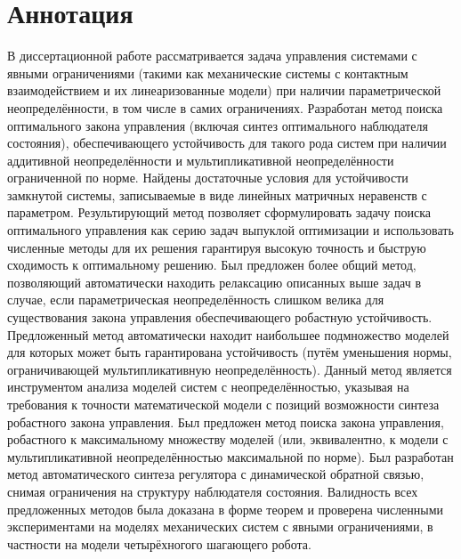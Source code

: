 \chapter*{Аннотация}                         %

В диссертационной работе рассматривается задача управления системами с явными ограничениями (такими как механические системы с контактным взаимодействием и их линеаризованные модели) при наличии параметрической неопределённости, в том числе в самих ограничениях. Разработан метод поиска оптимального закона управления (включая синтез оптимального наблюдателя состояния), обеспечивающего устойчивость для такого рода систем при наличии аддитивной неопределённости и мультипликативной неопределённости ограниченной по норме. Найдены достаточные условия для устойчивости замкнутой системы, записываемые в виде линейных матричных неравенств с параметром. Результирующий метод позволяет сформулировать задачу поиска оптимального управления как серию задач выпуклой оптимизации и использовать численные методы для их решения гарантируя высокую точность и быструю сходимость к оптимальному решению. Был предложен более общий метод, позволяющий автоматически находить релаксацию описанных выше задач в случае, если параметрическая неопределённость слишком велика для существования закона управления обеспечивающего робастную устойчивость. Предложенный метод автоматически находит наибольшее подмножество моделей для которых может быть гарантирована устойчивость (путём уменьшения нормы, ограничивающей мультипликативную неопределённость). Данный метод является инструментом анализа моделей систем с неопределённостью, указывая на требования к точности математической модели с позиций возможности синтеза робастного закона управления. Был предложен метод поиска закона управления, робастного к максимальному множеству моделей (или, эквивалентно, к модели с мультипликативной неопределённостью максимальной по норме). Был разработан метод автоматического синтеза регулятора с динамической обратной связью, снимая ограничения на структуру наблюдателя состояния.  Валидность всех предложенных методов была доказана в форме теорем и проверена численными экспериментами на моделях механических систем с явными ограничениями, в частности на модели четырёхногого шагающего робота.